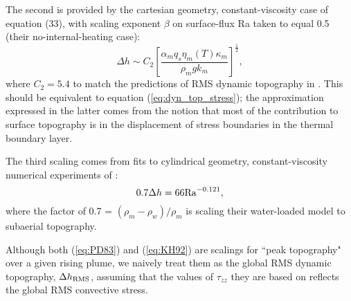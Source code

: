 The second is provided by the cartesian geometry, constant-viscosity case of \citet{Parsons1983} equation (33), with scaling exponent $\beta$ on surface-flux Ra taken to equal 0.5 (their no-internal-heating case):
\begin{equation}\label{eq:PD83}
\Delta h \sim C_2 \left[\frac{\alpha_m q_{s} \eta_m(T) \kappa_m}{\rho_m g k_m}\right]^\frac{1}{2},
\end{equation}
where $C_2 = 5.4$ to match the predictions of RMS dynamic topography in \citet{Lees2019}. This should be equivalent to equation (\ref{eq:dyn_top_stress}); the approximation expressed in the latter comes from the notion that most of the contribution to surface topography is in the displacement of stress boundaries in the thermal boundary layer.

The third scaling comes from fits to cylindrical geometry, constant-viscosity numerical experiments of \citet{Kiefer1992}:
\begin{equation}\label{eq:KH92}
0.7 \Delta h = 66 {\rm Ra}^{-0.121},
\end{equation}
where the factor of 0.7 = $(\rho_m - \rho_w) / \rho_m$ is scaling their water-loaded model to subaerial topography.

Although both (\ref{eq:PD83}) and (\ref{eq:KH92}) are scalings for ``peak topography" over a given rising plume, we naively treat them as the global RMS dynamic topography, $\Delta h_{\rm RMS}$, assuming that the values of $\tau_{zz}$ they are based on reflects the global RMS convective stress.

